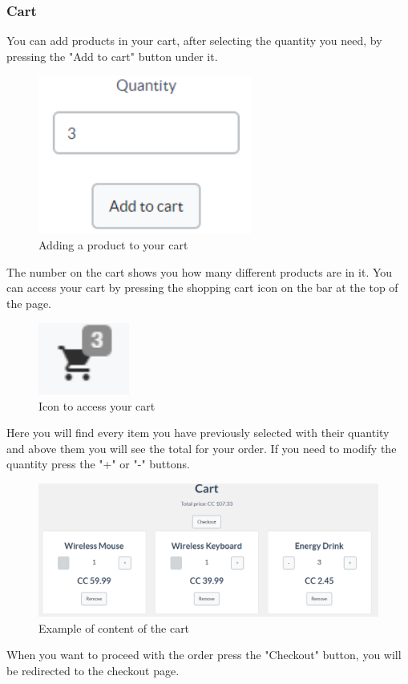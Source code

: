 	\subsubsection{Cart}
	You can add products in your cart, after selecting the quantity you need, 
	by pressing the "Add to cart" button under it.
	\begin{figure}[H]
		\includegraphics[width=7cm]{res/images/add_to_cart.png}
		\centering
		\caption{Adding a product to your cart}
	\end{figure}
	\noindent The number on the cart shows you how many different products are 
	in it. You can access your cart by pressing the shopping cart icon on 
	the bar at the top of the page.
	\begin{figure}[H]
		\includegraphics[width=3cm]{res/images/cart_icon.png}
		\centering
		\caption{Icon to access your cart}
	\end{figure}
	\noindent Here you will find every item you have previously selected with 
	their quantity and above them you will see the total for your order.
	If you need to modify the quantity press the "+" or "-" buttons. \\
	\begin{figure}[H]
		\includegraphics[width=15cm]{res/images/cart_example.png}
		\centering
		\caption{Example of content of the cart}
	\end{figure}
	\noindent When you want to proceed with the order press the "Checkout" button, 
	you will be redirected to the checkout page.
